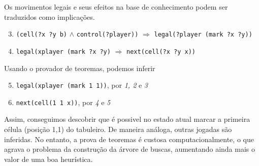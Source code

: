 Os movimentos legais e seus efeitos na base de conhecimento podem ser traduzidos
como implicações. 
\begin{enumerate}
  \setcounter{enumi}{2}
  \item \verb|(cell(?x ?y b)| $\land$ \verb|control(?player))|  
    $\Rightarrow$ \verb|legal(?player (mark ?x ?y))|
  \item \verb|legal(xplayer (mark ?x ?y)| $\Rightarrow$ 
    \verb|next(cell(?x ?y x))|
\end{enumerate}

Usando o provador de teoremas, podemos inferir 
\begin{enumerate}
  \setcounter{enumi}{4}
  \item \verb|legal(xplayer (mark 1 1))|, por {\it 1, 2} e {\it 3}
  \item \verb|next(cell(1 1 x))|, por {\it 4} e {\it 5}
\end{enumerate}

Assim, conseguimos descobrir que é possivel no estado atual marcar a primeira
célula (posição 1,1) do tabuleiro. De maneira análoga, outras jogadas são
inferidas. No entanto, a prova de teoremas é custosa computacionalmente, o que
agrava o problema da construção da árvore de buscas, aumentando ainda mais o
valor de uma boa heurística. 
